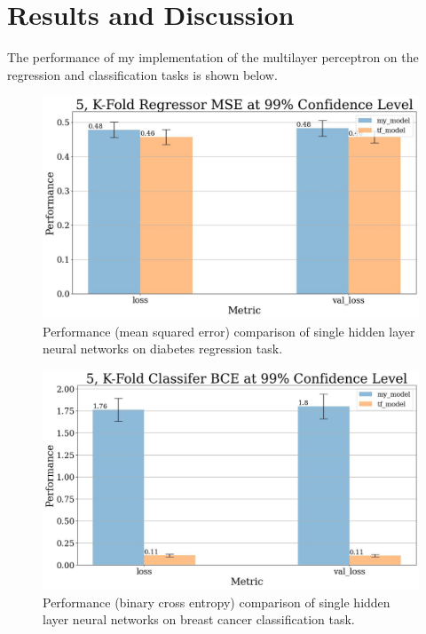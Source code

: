 \documentclass{article}
\begin{document}
\section{Results and Discussion}

The performance of my implementation of the multilayer perceptron on the
regression and classification tasks is shown below.

\afterpage

\begin{figure}[h]
	\includegraphics[scale=0.35]{one_layer_regressor_bar_chart_2.jpg}
	\caption{Performance (mean squared error) comparison of single hidden 
	layer neural networks on diabetes regression task.}
\end{figure}

\begin{figure}[h]
	\includegraphics[scale=0.35]{one_layer_classifier_bar_chart_2.jpg}
	\caption{Performance (binary cross entropy) comparison of single hidden layer 
	neural networks on breast cancer classification task.}
\end{figure}
\end{document}

